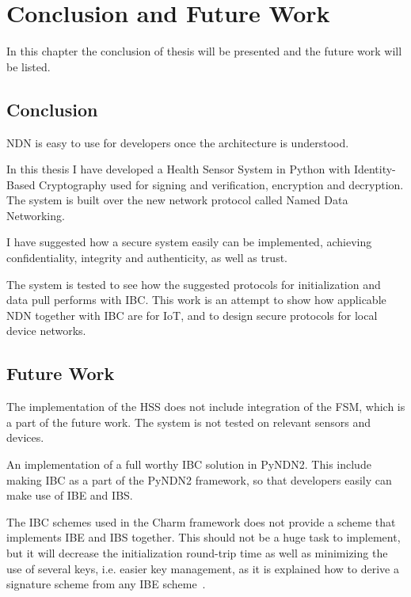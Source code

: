 \chapter{Conclusion and Future Work}\label{chp7:conclusion}
In this chapter the conclusion of thesis will be presented and the future work will be listed.

\section{Conclusion}
\gls{NDN} is easy to use for developers once the architecture is understood. 

In this thesis I have developed a Health Sensor System in Python with Identity-Based Cryptography used for signing and verification, encryption and decryption.
The system is built over the new network protocol called Named Data Networking.

I have suggested how a secure system easily can be implemented, achieving confidentiality, integrity and authenticity, as well as trust.

The system is tested to see how the suggested protocols for initialization and data pull performs with \gls{IBC}. 
This work is an attempt to show how applicable \gls{NDN} together with \gls{IBC} are for \gls{IoT}, and to design secure protocols for local device networks.

\section{Future Work}
The implementation of the \gls{HSS} does not include integration of the \gls{FSM}, which is a part of the future work.
The system is not tested on relevant sensors and devices.

An implementation of a full worthy \gls{IBC} solution in \gls{PyNDN2}.
This include making \gls{IBC} as a part of the PyNDN2 framework, so that developers easily can make use of \gls{IBE} and \gls{IBS}.

The \gls{IBC} schemes used in the Charm framework does not provide a scheme that implements \gls{IBE} and \gls{IBS} together.
This should not be a huge task to implement, but it will decrease the initialization round-trip time as well as minimizing the use of several keys, i.e. easier key management, as it is explained how to derive a signature scheme from any \gls{IBE} scheme~\cite[Section 4]{DBLP:conf/crypto/Waters09}.
